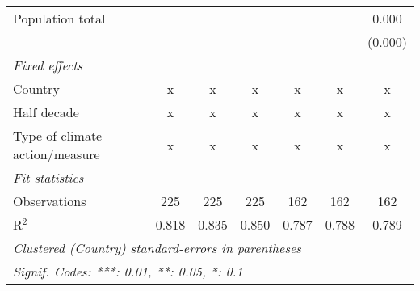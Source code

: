 \begin{tabular}{lcccccc}
   Population total                                             &                &                &                &                &                & 0.000\\   
                                                                &                &                &                &                &                & (0.000)\\   
   \emph{Fixed effects}\\
   Country                                                      & x              & x              & x              & x              & x              & x\\  
   Half decade                                                  & x              & x              & x              & x              & x              & x\\  
   Type of climate action/measure                               & x              & x              & x              & x              & x              & x\\  
   \midrule \emph{Fit statistics}\\
   Observations                                                 & 225            & 225            & 225            & 162            & 162            & 162\\  
   R$^2$                                                        & 0.818          & 0.835          & 0.850          & 0.787          & 0.788          & 0.789\\  
   \midrule
   \multicolumn{7}{l}{\emph{Clustered (Country) standard-errors in parentheses}}\\
   \multicolumn{7}{l}{\emph{Signif. Codes: ***: 0.01, **: 0.05, *: 0.1}}\\
\end{tabular}
\par\endgroup


